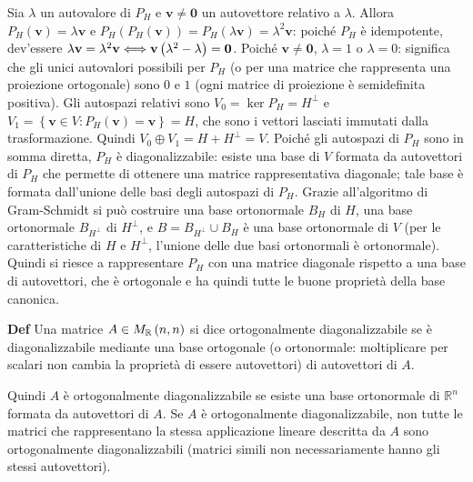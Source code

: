 \documentclass{article}
\begin{document}
Sia $\lambda $ un autovalore di $P_{H}$ e $\mathbf{v\neq 0}$ un autovettore
relativo a $\lambda $. Allora $P_{H}\left( \mathbf{v}\right) =\lambda 
\mathbf{v}$ e $P_{H}\left( P_{H}\left( \mathbf{v}\right) \right)
=P_{H}\left( \lambda \mathbf{v}\right) =\lambda ^{2}\mathbf{v}$: poich\'{e} $%
P_{H}$ \`{e} idempotente, dev'essere $\lambda \mathbf{v}=\lambda ^{2}\mathbf{%
v\Longleftrightarrow v}\left( \lambda ^{2}-\lambda \right) =\mathbf{0}$.
Poich\'{e} $\mathbf{v\neq 0}$, $\lambda =1$ o $\lambda =0$: significa che
gli unici autovalori possibili per $P_{H}$ (o per una matrice che
rappresenta una proiezione ortogonale) sono $0$ e $1$ (ogni matrice di
proiezione \`{e} semidefinita positiva). Gli autospazi relativi sono $%
V_{0}=\ker P_{H}=H^{\perp }$ e $V_{1}=\left\{ \mathbf{v}\in V:P_{H}\left( 
\mathbf{v}\right) =\mathbf{v}\right\} =H$, che sono i vettori lasciati
immutati dalla trasformazione. Quindi $V_{0}\oplus V_{1}=H+H^{\perp }=V$.
Poich\'{e} gli autospazi di $P_{H}$ sono in somma diretta, $P_{H}$ \`{e}
diagonalizzabile: esiste una base di $V$ formata da autovettori di $P_{H}$
che permette di ottenere una matrice rappresentativa diagonale; tale base 
\`{e} formata dall'unione delle basi degli autospazi di $P_{H}$. Grazie
all'algoritmo di Gram-Schmidt si pu\`{o} costruire una base ortonormale $%
B_{H}$ di $H$, una base ortonormale $B_{H^{\perp }}$ di $H^{\perp }$, e $%
B=B_{H^{\perp }}\cup B_{H}$ \`{e} una base ortonormale di $V$ (per le
caratteristiche di $H$ e $H^{\perp }$, l'unione delle due basi ortonormali 
\`{e} ortonormale). Quindi si riesce a rappresentare $P_{H}$ con una matrice
diagonale rispetto a una base di autovettori, che \`{e} ortogonale e ha
quindi tutte le buone propriet\`{a} della base canonica.

\textbf{Def} Una matrice $A\in M_{%
\mathbb{R}
}\left( n,n\right) $ si dice ortogonalmente diagonalizzabile se \`{e}
diagonalizzabile mediante una base ortogonale (o ortonormale: moltiplicare
per scalari non cambia la propriet\`{a} di essere autovettori) di
autovettori di $A$.

Quindi $A$ \`{e} ortogonalmente diagonalizzabile se esiste una base
ortonormale di $%
\mathbb{R}
^{n}$ formata da autovettori di $A$. Se $A$ \`{e} ortogonalmente
diagonalizzabile, non tutte le matrici che rappresentano la stessa
applicazione lineare descritta da $A$ sono ortogonalmente diagonalizzabili
(matrici simili non necessariamente hanno gli stessi autovettori).
\end{document}
